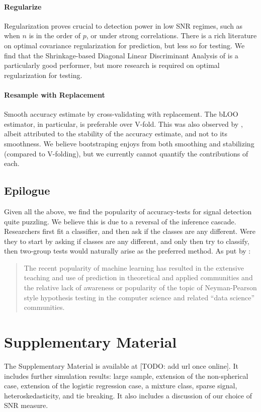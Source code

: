 \documentclass[]{bio}
\begin{document}
\paragraph{Regularize}
Regularization proves crucial to detection power in low SNR regimes, such as when $n$ is in the order of $p$, or under strong correlations.
There is a rich literature on optimal covariance regularization for prediction, but less so for testing.
We find that the Shrinkage-based Diagonal Linear Discriminant Analysis of \cite{pang_shrinkage-based_2009} is a particularly good performer, but more research is required on optimal regularization for testing. 


\paragraph{Resample with Replacement}
Smooth accuracy estimate by cross-validating with replacement. 
The bLOO estimator, in particular, is preferable over V-fold.
This was also observed by \cite{yu2007two}, albeit attributed to the stability of the accuracy estimate, and not to its smoothness. 
We believe bootstraping enjoys from both smoothing and stabilizing (compared to V-folding), but we currently cannot quantify the contributions of each. 





\subsection{Epilogue}
Given all the above, we find the popularity of accuracy-tests for signal detection quite puzzling. 
We believe this is due to a reversal of the inference cascade. 
Researchers first fit a classifier, and then ask if the classes are any different.
Were they to start by asking if classes are any different, and only then try to classify, then two-group tests would naturally arise as the preferred method. 
As put by \cite{ramdas_classification_2016}:
\begin{quote}
	The recent popularity of machine learning has resulted in the extensive teaching and use
	of prediction in theoretical and applied communities and the relative lack of awareness or
	popularity of the topic of Neyman-Pearson style hypothesis testing in the computer science
	and related ``data science'' communities.
\end{quote}


\section{Supplementary Material}
The Supplementary Material is available at [TODO: add url once online]. 
It includes further simulation results: large sample, extension of the non-spherical case, extension of the logistic regression case, a mixture class, sparse signal, heteroskedasticity, and tie breaking. 
It also includes a discussion of our choice of SNR measure.
\end{document}
